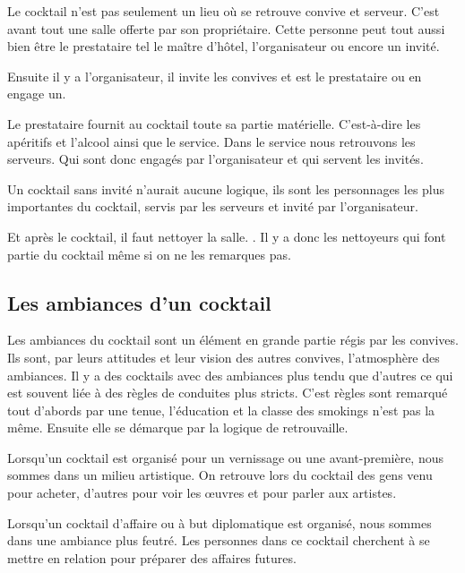 Le cocktail n’est pas seulement un lieu où se retrouve convive et serveur. C’est avant tout une salle offerte par son propriétaire. Cette personne peut tout aussi bien être le prestataire tel le maître d’hôtel, l’organisateur ou encore un invité.

Ensuite il y a l’organisateur, il invite les convives et est le prestataire ou en engage un.

Le prestataire fournit au cocktail toute sa partie matérielle. C’est-à-dire les apéritifs et l’alcool ainsi que le service. Dans le service nous retrouvons les serveurs. Qui sont donc engagés par l’organisateur et qui servent les invités.

Un cocktail sans invité n’aurait aucune logique, ils sont les personnages les plus importantes du cocktail, servis par les serveurs et invité par l’organisateur.

Et après le cocktail, il faut nettoyer la salle. . Il y a donc les nettoyeurs qui font partie du cocktail même si on ne les remarques pas.

\subsection{Les ambiances d'un cocktail}




Les ambiances du cocktail sont un élément en grande partie régis par les convives. Ils sont, par leurs attitudes et leur vision des autres convives, l’atmosphère des ambiances. 
Il y a des cocktails avec des ambiances plus tendu que d’autres ce qui est souvent liée à des règles de conduites plus stricts. C’est règles sont remarqué tout d’abords par une tenue, l’éducation et la classe des smokings n’est pas la même.  Ensuite elle se démarque par la logique de retrouvaille. 

Lorsqu’un cocktail est organisé pour un vernissage ou une avant-première, nous sommes dans un milieu artistique. On retrouve lors du cocktail des gens venu pour acheter, d’autres pour voir les œuvres et pour parler aux artistes.

Lorsqu’un cocktail d’affaire ou à but diplomatique est organisé, nous sommes dans une ambiance plus feutré.  Les personnes dans ce cocktail cherchent à se mettre en relation pour préparer des affaires futures.

